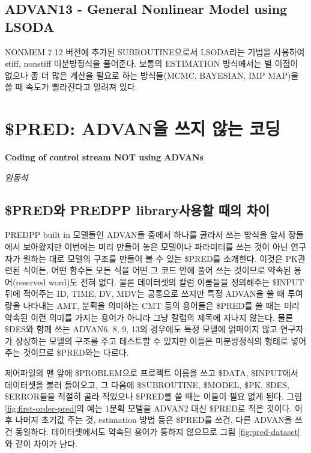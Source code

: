 \documentclass[
  10pt,
  krantz2,
  a4paper]{krantz}
\theoremstyle{definition}
\theoremstyle{definition}
\theoremstyle{definition}
\theoremstyle{remark}
\begin{document}
\hypertarget{advan13---general-nonlinear-model-using-lsoda}{%
\section{ADVAN13 - General Nonlinear Model using LSODA}\label{advan13---general-nonlinear-model-using-lsoda}}

NONMEM 7.12 버전에 추가된 SUBROUTINE으로서 LSODA라는 기법을 사용하여 stiff, nonstiff 미분방정식을 풀어준다. 보통의 ESTIMATION 방식에서는 별 이점이 없으나 좀 더 많은 계산을 필요로 하는 방식들(MCMC, BAYESIAN, IMP MAP)을 쓸 때 속도가 빨라진다고 알려져 있다.

\hypertarget{PRED}{%
\chapter{\$PRED: ADVAN을 쓰지 않는 코딩}\label{PRED}}

\textbf{Coding of control stream NOT using ADVANs}

\emph{임동석}

\hypertarget{preduxc640-predpp-libraryuxc0acuxc6a9uxd560-uxb54cuxc758-uxcc28uxc774}{%
\section{\$PRED와 PREDPP library사용할 때의 차이}\label{preduxc640-predpp-libraryuxc0acuxc6a9uxd560-uxb54cuxc758-uxcc28uxc774}}

PREDPP built in 모델들인 ADVAN들 중에서 하나를 골라서 쓰는 방식을 앞서 장들에서 보아왔지만 이번에는 미리 만들어 놓은 모델이나 파라미터를 쓰는 것이 아닌 연구자가 원하는 대로 모델의 구조를 만들어 볼 수 있는 \$PRED를 소개한다. 이것은 PK관련된 식이든, 어떤 함수든 모든 식을 어떤 그 코드 안에 풀어 쓰는 것이므로 약속된 용어(reserved word)도 전혀 없다. 물론 데이터셋의 칼럼 이름들을 정의해주는 \$INPUT 뒤에 적어주는 ID, TIME, DV, MDV는 공통으로 쓰지만 특정 ADVAN을 쓸 때 투여량을 나타내는 AMT, 분획을 의미하는 CMT 등의 용어들은 \$PRED를 쓸 때는 미리 약속된 이런 의미를 가지는 용어가 아니라 그냥 칼럼의 제목에 지나지 않는다. 물론 \$DES와 함께 쓰는 ADVAN6, 8, 9, 13의 경우에도 특정 모델에 얽매이지 않고 연구자가 상상하는 모델의 구조를 주고 테스트할 수 있지만 이들은 미분방정식의 형태로 넣어주는 것이므로 \$PRED와는 다르다.

제어파일의 맨 앞에 \$PROBLEM으로 프로젝트 이름을 쓰고 \$DATA, \$INPUT에서 데이터셋을 불러 들여오고, 그 다음에 \$SUBROUTINE, \$MODEL, \$PK, \$DES, \$ERROR들을 적절히 골라 적었으나 \$PRED를 쓸 때는 이들이 필요 없게 된다. 그림 \ref{fig:first-order-pred}의 예는 1분획 모델을 ADVAN2 대신 \$PRED로 적은 것이다. 이후 나머지 초기값 주는 것, estimation 방법 등은 \$PRED를 쓰건, 다른 ADVAN을 쓰건 동일하다. 데이터셋에서도 약속된 용어가 통하지 않으므로 그림 \ref{fig:pred-dataset}와 같이 차이가 난다.
\end{document}
